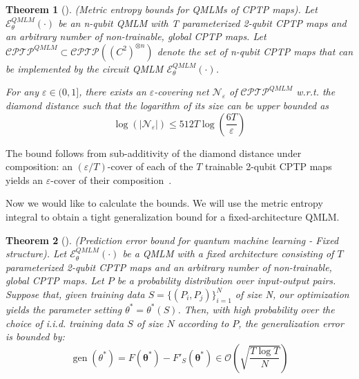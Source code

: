 \documentclass[%
 reprint,
superscriptaddress,
 amsmath,amssymb,
 aps,
]{revtex4-2}
\newcommand{\E}{\mathcal{E}}
\newtheorem{theorem}{Theorem}[section]
\begin{document}
\begin{theorem}[\!\!\cite{caro2022generalization}]
    (Metric entropy bounds for QMLMs of CPTP maps). Let $\E^{QMLM}_\theta(\cdot)$ be an n-qubit QMLM with T parameterized 2-qubit CPTP maps and an arbitrary number of non-trainable, global CPTP maps. Let $\mathcal{CPTP}^{QMLM}\subset \mathcal{CPTP}((C^2)^{\otimes n})$ denote the set of n-qubit CPTP maps that can be implemented by the circuit QMLM $\E^{QMLM}_\theta(\cdot)$.

    For any $\varepsilon \in (0, 1]$, there exists an $\varepsilon$-covering net $\mathcal{N}_\varepsilon$ of $\mathcal{CPTP}^{QMLM}$ w.r.t. the diamond distance such that the logarithm of its size can be upper bounded as
    \begin{equation}
        \log(|\mathcal{N_\varepsilon}|)\le 512T\log\left(\frac{6T}{\varepsilon}\right)
    \end{equation}
    \label{thm: Metric entropy bounds}
\end{theorem}
The bound follows from sub-additivity of the diamond distance under composition: an $(\varepsilon/T)$-cover of each of the $T$ trainable 2-qubit CPTP maps yields an $\varepsilon$-cover of their composition~\cite{caro2022generalization,watrous2018theory}.

Now we would like to calculate the bounds. We will use the metric entropy integral to obtain a tight generalization bound for a fixed-architecture QMLM.

\begin{theorem}[\!\!\cite{caro2022generalization}]
    (Prediction error bound for quantum machine learning - Fixed structure). Let $\E^{QMLM}_\theta(\cdot)$ be a QMLM with a fixed architecture consisting of $T$ parameterized 2-qubit CPTP maps and an arbitrary number of non-trainable, global CPTP maps. Let $P$ be a probability distribution over input-output pairs. Suppose that, given training data $S = \{(P_i, P_j)\}_{i=1}^N$ of size N, our optimization yields the parameter setting $\theta^* = \theta^*(S)$. Then, with high probability over the choice of i.i.d. training data $S$ of size $N$ according to $P$, the generalization error is bounded by:
    \begin{equation}
        \operatorname{gen}\left(\theta^*\right) = F\left(\boldsymbol{\theta}^*\right)-F'_S\left(\boldsymbol{\theta}^*\right) \in \mathcal{O}\left(\sqrt{\frac{T \log T}{N}}\right)
    \end{equation}
\end{theorem}
\end{document}
